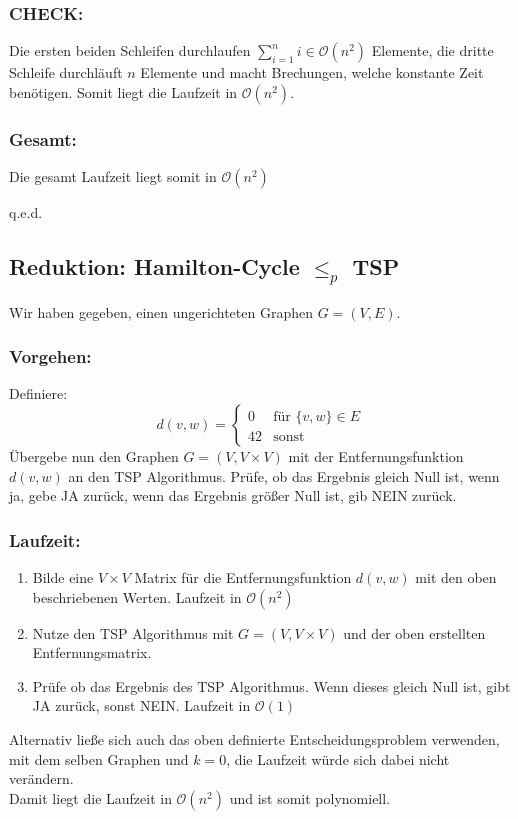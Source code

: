 \documentclass[a4paper,11pt,twoside]{article}
\begin{document}
\subsubsection*{CHECK:}
Die ersten beiden Schleifen durchlaufen $\sum_{i=1}^{n} i \in \mathcal{O}(n^2)$ Elemente, die dritte Schleife durchläuft $n$ Elemente und macht Brechungen, welche konstante Zeit benötigen. Somit liegt die Laufzeit in $\mathcal{O}(n^2)$.

\subsubsection*{Gesamt:}
Die gesamt Laufzeit liegt somit in $\mathcal{O}(n^2)$ \begin{flushright}
	q.e.d.
\end{flushright}


\subsection*{Reduktion: Hamilton-Cycle $\leq_p $ TSP}
Wir haben gegeben, einen ungerichteten Graphen $G=(V,E)$.
\subsubsection*{Vorgehen:}
Definiere:
\[ d(v,w)=\begin{cases}0&\text{für }\{v,w\}\in E\\42&\text{sonst}\end{cases} \]
Übergebe nun den Graphen $G=(V, V\times V)$ mit der Entfernungsfunktion $d(v,w)$ an den TSP Algorithmus. Prüfe, ob das Ergebnis gleich Null ist, wenn ja, gebe JA zurück, wenn das Ergebnis größer Null ist, gib NEIN zurück.
\subsubsection*{Laufzeit:} 
\begin{enumerate}	
	\item Bilde eine $V\times V$ Matrix für die Entfernungsfunktion $d(v,w)$ mit den oben beschriebenen Werten. Laufzeit in $\mathcal{O}(n^2)$
	\item Nutze den TSP Algorithmus mit $G=(V,V\times V)$ und der oben erstellten Entfernungsmatrix.
	\item Prüfe ob das Ergebnis des TSP Algorithmus. Wenn dieses gleich Null ist, gibt JA zurück, sonst NEIN. Laufzeit in $\mathcal{O}(1)$
\end{enumerate}
Alternativ ließe sich auch das oben definierte Entscheidungsproblem verwenden, mit dem selben Graphen und $k=0$, die Laufzeit würde sich dabei nicht verändern.\\
Damit liegt die Laufzeit in $\mathcal{O}(n^2)$ und ist somit polynomiell.
\end{document}
